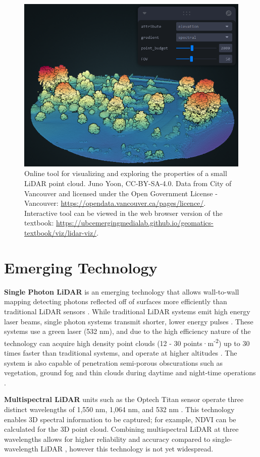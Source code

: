 \documentclass[
]{book}
\begin{document}
\begin{figure}
\includegraphics[width=0.75\linewidth]{images/15-lidar-visualization-static} \caption{Online tool for visualizing and exploring the properties of a small LiDAR point cloud. Juno Yoon, CC-BY-SA-4.0. Data from City of Vancouver and licensed under the Open Government License - Vancouver: \url{https://opendata.vancouver.ca/pages/licence/}. Interactive tool can be viewed in the web browser version of the textbook: \url{https://ubcemergingmedialab.github.io/geomatics-textbook/viz/lidar-viz/}.}\label{fig:15-lidar-visualization-static}
\end{figure}

\section{Emerging Technology}\label{emerging-technology}

\textbf{Single Photon LiDAR} is an emerging technology that allows wall-to-wall mapping detecting photons reflected off of surfaces more efficiently than traditional LiDAR sensors \citep{swatantran_rapid_2016}. While traditional LiDAR systems emit high energy laser beams, single photon systems transmit shorter, lower energy pulses \citep{swatantran_rapid_2016}. These systems use a green laser (532 nm), and due to the high efficiency nature of the technology can acquire high density point clouds (12 - 30 points·m\textsuperscript{-2}) up to 30 times faster than traditional systems, and operate at higher altitudes \citep{swatantran_rapid_2016}. The system is also capable of penetration semi-porous obscurations such as vegetation, ground fog and thin clouds during daytime and night-time operations \citep{swatantran_rapid_2016}.

\textbf{Multispectral LiDAR} units such as the Optech Titan sensor operate three distinct wavelengths of 1,550 nm, 1,064 nm, and 532 nm \citep{morsy_multispectral_2017}. This technology enables 3D spectral information to be captured; for example, NDVI can be calculated for the 3D point cloud. Combining multispectral LiDAR at three wavelengths allows for higher reliability and accuracy compared to single-wavelength LiDAR \citep{morsy_multispectral_2017}, however this technology is not yet widespread.
\end{document}
